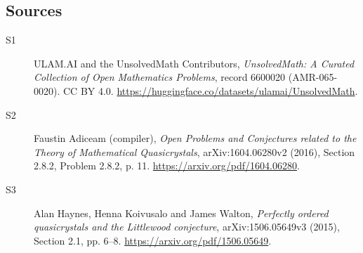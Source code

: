\documentclass[11pt]{article}
\begin{document}
\subsection{Sources}
\begin{description}
\item[\hypertarget{source:6600020:1}{S1}] ULAM.AI and the UnsolvedMath Contributors, \emph{UnsolvedMath: A Curated Collection of Open Mathematics Problems}, record 6600020 (AMR-065-0020). CC BY 4.0. \url{https://huggingface.co/datasets/ulamai/UnsolvedMath}.
\item[\hypertarget{source:6600020:2}{S2}] Faustin Adiceam (compiler), \emph{Open Problems and Conjectures related to the Theory of Mathematical Quasicrystals}, arXiv:1604.06280v2 (2016), Section 2.8.2, Problem 2.8.2, p. 11. \url{https://arxiv.org/pdf/1604.06280}.
\item[\hypertarget{source:6600020:3}{S3}] Alan Haynes, Henna Koivusalo and James Walton, \emph{Perfectly ordered quasicrystals and the Littlewood conjecture}, arXiv:1506.05649v3 (2015), Section 2.1, pp. 6--8. \url{https://arxiv.org/pdf/1506.05649}.
\end{description}
\label{end:6600020}
\end{document}
